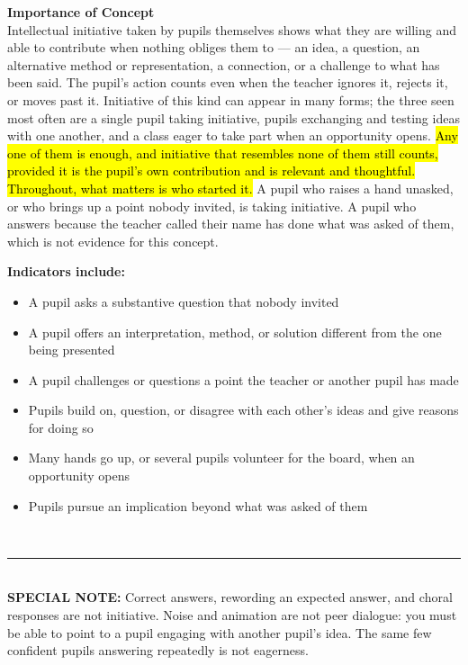 \documentclass[10pt,a4paper]{article}
\newcommand{\twopane}[2]{%
  \noindent
  \begin{minipage}[t]{0.475\linewidth}\RaggedRight
    {\bfseries\small Importance of Concept}\\[1.4mm]
    \footnotesize #1 \normalsize
  \end{minipage}\hfill
  \begin{minipage}[t]{0.475\linewidth}\RaggedRight
    {\bfseries\small Indicators include:}\\[0.6mm]
    #2
  \end{minipage}\\[2mm]}
\newcommand{\specialnote}[1]{%
  \noindent\textcolor{trule}{\rule{\linewidth}{0.4pt}}\\[1.2mm]
  {\footnotesize\textbf{SPECIAL NOTE:} #1}\\[2mm]}
\begin{document}
\twopane{
Intellectual initiative taken by pupils themselves shows what they are willing and able to contribute when nothing obliges them to --- an idea, a question, an alternative method or representation, a connection, or a challenge to what has been said. The pupil's action counts even when the teacher ignores it, rejects it, or moves past it. Initiative of this kind can appear in many forms; the three seen most often  are a single pupil taking initiative, pupils exchanging and testing ideas with one another, and a class eager to take part when an opportunity opens. \hl{Any one of them is enough, and initiative that resembles none of  them still counts, provided it is the pupil's own contribution and is relevant and thoughtful. Throughout,  what matters is who started it.} A pupil who raises a hand unasked, or who brings up a point nobody invited, is taking initiative. A pupil who answers because the teacher called their name has done what was asked of them, which is not evidence for this concept.
}{
\footnotesize
\begin{itemize}
  \item A pupil asks a substantive question that nobody invited
  \item A pupil offers an interpretation, method, or solution different from the one being presented
  \item A pupil challenges or questions a point the teacher or another pupil has made
  \item Pupils build on, question, or disagree with each other's ideas and give reasons for doing so
  \item Many hands go up, or several pupils volunteer for the board, when an opportunity opens
  \item Pupils pursue an implication beyond what was asked of them
\end{itemize}
\normalsize
}
 
\specialnote{Correct answers, rewording an expected answer, and choral responses are not initiative. Noise
and animation are not peer dialogue: you must be able to point to a pupil engaging with another pupil's
idea. The same few confident pupils answering repeatedly is not eagerness.}
 
\end{document}
